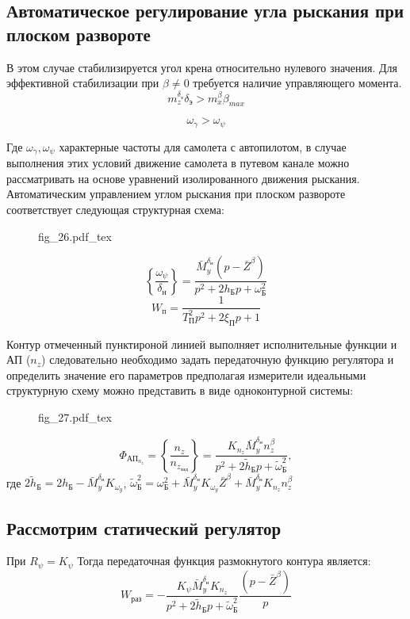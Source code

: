 \documentclass{article}
\begin{document}
\subsection{Автоматическое регулирование угла рыскания при плоском развороте}
В этом случае стабилизируется угол крена относительно нулевого значения. Для эффективной стабилизации при $\beta \neq 0$ требуется наличие управляющего момента.
\[
	m_z^{\delta_\text{э}} \delta_\text{э} > m_x^\beta \beta_{max}
\]

\[
	\omega_{\gamma} > \omega_{\psi}
\]

Где $\omega_{\gamma}, \omega_{\psi}$ характерные частоты для самолета с автопилотом, в случае выполнения этих условий движение самолета в путевом канале можно рассматривать на основе уравнений изолированного движения рыскания. Автоматическим управлением углом рыскания при плоском развороте соответствует следующая структурная схема:

\begin{figure}[H]
	\centering
	{fig_26.pdf_tex}
\end{figure}

\[
	\left\{\frac{\omega_{\psi}}{\delta_\text{н}}\right\} =\frac{\bar{M}_y^{\delta_\text{н}}(p - \bar{Z}^\beta)}{p^2 + 2h_\text{Б} p + \omega_\text{Б}^2} 
\]
\[
	W_\text{п} = \frac{1}{T_\text{П}^2 p^2 + 2\xi_\text{П} p + 1}
\]

Контур отмеченный пунктироной линией выполняет исполнительные функции и АП ($n_z$) следовательно необходимо задать передаточную функцию регулятора и определить значение его параметров предполагая измерители идеальными структурную схему можно представить в виде одноконтурной системы:

\begin{figure}[H]
	\centering
	{fig_27.pdf_tex}
\end{figure}


\[
	\Phi_{\text{АП}_{n_z}} = \left\{\frac{n_z}{n_{z_\text{зад}}} \right\} =\frac{K_{n_z}\bar{M}_y^{\delta_\text{н}} n_z^\beta}{p^2 + 2 \tilde{h}_\text{Б} p + \tilde{\omega}_\text{Б}^2},
\]
где $2\tilde{h}_\text{Б} = 2h_\text{Б} -\bar{M}_y^{\delta_\text{н}} K_{{\omega}_y}$, $\tilde{\omega}_\text{Б}^2 = \omega_\text{Б}^2 +\bar{M}_y^{\delta_\text{н}}K_{\omega_y}\bar{Z}^\beta + \bar{M}_y^{\delta_\text{н}} K_{n_z}n_z^\beta$

\subsection{Рассмотрим статический регулятор}
При $R_\psi = K_\psi$
Тогда передаточная функция размокнутого контура является:
\[
	W_\text{раз} = -\frac{K_{\psi} \bar{M}_y^{\delta_\text{н}} K_{n_z}}{p^2 + 2 \tilde{h}_\text{Б} p + \tilde{\omega}_\text{Б}^2} \frac{(p - \bar{Z}^\beta)}{p}
\]
\end{document}
